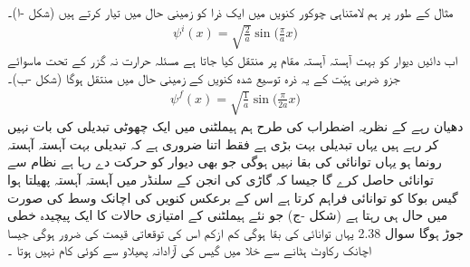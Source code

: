  مثال کے طور پر ہم لامتناہی چوکور کنویں میں ایک ذرا کو زمینی حال میں تیار کرتے ہیں (شکل -ا)۔
\begin{align}
\psi^i (x) = \sqrt{\frac{2}{a}} \sin \big ( \frac{\pi}{a} x \big )
\end{align}
 اب دائیں  دیوار کو بہت آہستہ آہستہ مقام  پر منتقل کیا جاتا ہے مسئلہ حرارت نہ گزر کے تحت ماسوائے جزو ضربی ہیّت کے یہ ذرہ توسیع شدہ کنویں کے زمینی حال میں منتقل ہوگا  (شکل  -ب)۔
\begin{align}
\psi^f (x) = \sqrt{\frac{1}{a}} \sin \big ( \frac{\pi}{2a} x \big )
\end{align}
دھیان رہے کے نظریہ اضطراب کی طرح ہم ہيملٹنی میں ایک چھوٹی تبدیلی کی بات نہیں کر رہے ہیں یہاں تبدیلی بہت بڑی ہے فقط اتنا ضروری ہے کہ تبدیلی بہت آہستہ آہستہ رونما ہو یہاں توانائی کی بقا نہیں ہوگی جو بھی دیوار کو حرکت دے رہا ہے نظام سے توانائی حاصل کرے گا جیسا کہ گاڑی کی انجن کے سلنڈر میں آہستہ آہستہ پھیلتا ہوا گیس بوکا کو توانائی فراہم کرتا ہے اس کے برعکس کنویں کی اچانک وسط کی صورت میں حال  ہی رہتا ہے  (شکل  -ج)  جو نئے ہیملٹنی کے امتیازی حالات کا ایک پیچیدہ خطی جوڑ ہوگا سوال 2.38 یہاں توانائی کی بقا ہوگی کم ازکم اس کی توقعاتی قیمت کی ضرور ہوگی جیسا اچانک رکاوٹ ہٹانے سے خلا میں گیس کی آزادانہ پھیلاو سے کوئی کام نہیں ہوتا ۔


